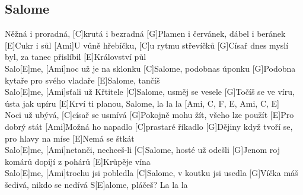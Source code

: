 \documentclass[10pt]{article}
\begin{document}
\begin{Large}
\begin{minipage}{\textwidth}
\subsection{Salome}
\begin{multicols}{2}
\begin{guitar}
	[Ami]Něžná i proradná, [C]krutá i bezradná
	[G]Plamen i červánek, ďábel i beránek
	[E]Cukr i sůl
	[Ami]U vůně hřebíčku, [C]u rytmu střevíčků
	[G]Císař dnes myslí byl, za tanec přislíbil
	[E]Království půl
	\\
	[Ami]Salo[E]me, [Ami]noc už je na sklonku
	[C]Salome, podobnas úponku
	[G]Podobna kytaře pro svého vladaře
	[E]Salome, tančíš
	\\
	[Ami]Salo[E]me, [Ami]sťali už Křtitele
	[C]Salome, usměj se vesele
	[G]Točíš se ve víru, ústa jak upíru
	[E]Krví ti planou, Salome, 
	la la la [Ami, C, F, E, Ami, C, E]
	\\
	[Ami]Noci už ubývá, [C]císař se usmívá
	[G]Pokojně mohu žít, všeho lze použít
	[E]Pro dobrý stát
	[Ami]Možná ho napadlo [C]prastaré říkadlo
	[G]Dějiny když tvoří se, pro hlavy na míse
	[E]Nemá se štkát
	\\
	[Ami]Salo[E]me, [Ami]netanči, nechceš-li
	[C]Salome, hosté už odešli
	[G]Jenom roj komárů dopíjí z pohárů
	[E]Krůpěje vína
	\\
	[Ami]Salo[E]me, [Ami]trochu jsi pobledla
	[C]Salome, v koutku jsi usedla
	[G]Víčka máš šedivá, nikdo se nedívá
	S[E]alome, pláčeš? La la la
\end{guitar}
\end{multicols}
\end{minipage}

\begin{minipage}{\textwidth}

\end{minipage}
\end{Large}
\end{document}
